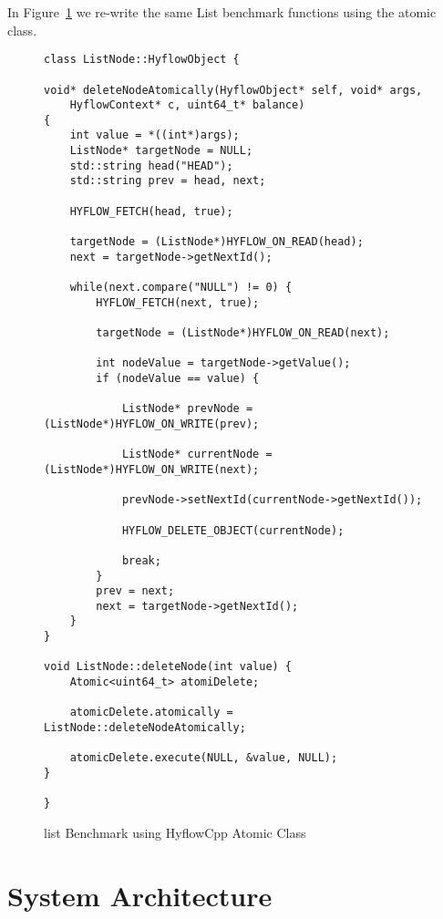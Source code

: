 \documentclass[12pt,english]{report}
\begin{document}
In Figure~\ref{Fig:listClassDelete} we re-write the same List benchmark functions using the atomic class. 

\begin{figure}
\centering
\begin{lstlisting}
class ListNode::HyflowObject {

void* deleteNodeAtomically(HyflowObject* self, void* args,
	HyflowContext* c, uint64_t* balance)
{
	int value = *((int*)args);
	ListNode* targetNode = NULL;
	std::string head("HEAD");
	std::string prev = head, next;

	HYFLOW_FETCH(head, true);
	
	targetNode = (ListNode*)HYFLOW_ON_READ(head);
	next = targetNode->getNextId();

	while(next.compare("NULL") != 0) {
		HYFLOW_FETCH(next, true);
		
		targetNode = (ListNode*)HYFLOW_ON_READ(next);
		
		int nodeValue = targetNode->getValue();
		if (nodeValue == value) {
		
			ListNode* prevNode = (ListNode*)HYFLOW_ON_WRITE(prev);
			
			ListNode* currentNode = (ListNode*)HYFLOW_ON_WRITE(next);
			
			prevNode->setNextId(currentNode->getNextId());
			
			HYFLOW_DELETE_OBJECT(currentNode);
			
			break;
		}
		prev = next;
		next = targetNode->getNextId();
	}
}

void ListNode::deleteNode(int value) {
	Atomic<uint64_t> atomiDelete;	
	
	atomicDelete.atomically = ListNode::deleteNodeAtomically;
	
	atomicDelete.execute(NULL, &value, NULL);
}

}
\end{lstlisting}
\caption{list Benchmark using HyflowCpp Atomic Class}
\label{Fig:listClassDelete}
\end{figure}


\chapter{System Architecture}\label{chap:sysArch}
\end{document}
